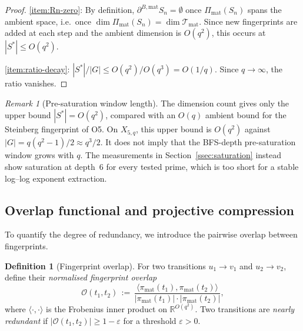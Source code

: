 \documentclass[11pt]{article}
\theoremstyle{definition}
\newtheorem{definition}[theorem]{Definition}
\theoremstyle{remark}
\newtheorem{remark}[theorem]{Remark}
\newcommand{\R}{\mathbb{R}}
\newcommand{\Tmat}{\mathcal{T}_{\mathrm{mat}}}
\begin{document}
    \begin{proof}
      \eqref{item:Rn-zero}: By definition, $\partial^{B,\mathrm{mat}} S_n = \emptyset$ once
      $\Pi_{\mathrm{mat}}(S_n)$ spans the ambient space, i.e.\ once
      $\dim \Pi_{\mathrm{mat}}(S_n) = \dim \Tmat$.
      Since new fingerprints are added at each step and the ambient dimension is $O(q^2)$,
      this occurs at $|S^*| \leq O(q^2)$.

      \eqref{item:ratio-decay}: $|S^*|/|G| \leq O(q^2)/O(q^3) = O(1/q)$.
      Since $q \to \infty$, the ratio vanishes.
    \end{proof}

    \begin{remark}[Pre-saturation window length]
      \label{rem:window-length}
      The dimension count gives only the upper bound $|S^*|=O(q^2)$, compared with an
      $O(q)$ ambient bound for the Steinberg fingerprint of O5.
      On $X_{5,q}$, this upper bound is $O(q^2)$ against
      $|G|=q(q^2-1)/2\approx q^3/2$.
      It does not imply that the BFS-depth pre-saturation window grows with $q$.
      The measurements in Section~\ref{ssec:saturation} instead show saturation at depth~6
      for every tested prime, which is too short for a stable log--log exponent extraction.
    \end{remark}

  \subsection{Overlap functional and projective compression}
    \label{ssec:overlap}

    To quantify the degree of redundancy, we introduce the pairwise overlap between
    fingerprints.

    \begin{definition}[Fingerprint overlap]
      \label{def:overlap}
      For two transitions $u_1 \to v_1$ and $u_2 \to v_2$, define their
      \emph{normalised fingerprint overlap}
      \begin{equation}
        \mathcal{O}(t_1, t_2) \,:=\,
        \frac{\langle \pi_{\mathrm{mat}}(t_1), \pi_{\mathrm{mat}}(t_2) \rangle}
        {|\pi_{\mathrm{mat}}(t_1)| \cdot |\pi_{\mathrm{mat}}(t_2)|},
      \end{equation}
      where $\langle \cdot, \cdot \rangle$ is the Frobenius inner product on
      $\R^{O(q^2)}$.
      Two transitions are \emph{nearly redundant} if $|\mathcal{O}(t_1, t_2)| \geq 1 - \varepsilon$
      for a threshold $\varepsilon > 0$.
    \end{definition}
\end{document}
